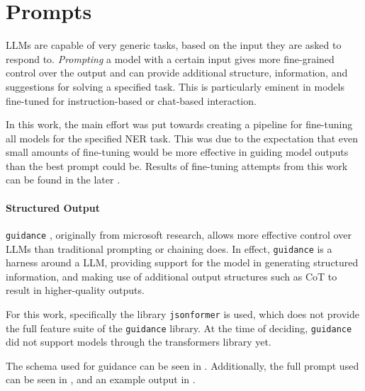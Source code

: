 


\section{Prompts}\label{sec:prompts}
\glspl{LLM} are capable of very generic tasks, based on the input they are asked to respond to.
\textit{Prompting} a model with a certain input gives more fine-grained control over the output and can provide additional structure, information, and suggestions for solving a specified task.
This is particularly eminent in models fine-tuned for instruction-based or chat-based interaction.

In this work, the main effort was put towards creating a pipeline for fine-tuning all models for the specified \gls{NER} task.
This was due to the expectation that even small amounts of fine-tuning would be more effective in guiding model outputs than the best prompt could be.
Results of fine-tuning attempts from this work can be found in the later .

\paragraph{Structured Output}
\texttt{guidance} \cite{guidance_2023}, originally from \gls{microsoft} research, allows more effective control over \glspl{LLM} than traditional prompting or chaining does.
In effect, \texttt{guidance} is a harness around a \gls{LLM}, providing support for the model in generating structured information, and making use of additional output structures such as CoT \cite{wei_chainofthought_2022} to result in higher-quality outputs.

For this work, specifically the library \texttt{jsonformer} \cite{1rgs_2023} is used, which does not provide the full feature suite of the \texttt{guidance} library.
At the time of deciding, \texttt{guidance} did not support models through the \gls{transformers} library yet.

The schema used for guidance can be seen in .
Additionally, the full prompt used can be seen in , and an example output in .



